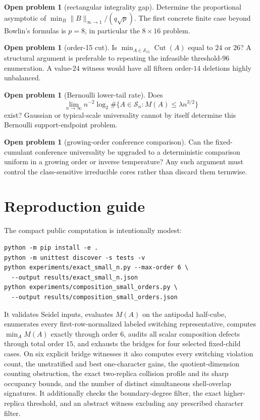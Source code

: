 \documentclass[11pt]{article}
\theoremstyle{definition}
\newtheorem{problem}[theorem]{Open problem}
\theoremstyle{remark}
\newcommand{\Sn}{\mathcal S_n}
\newcommand{\Cut}{\operatorname{Cut}}
\begin{document}
\begin{problem}[rectangular integrality gap]
Determine the proportional asymptotic of
$\min_B\|B\|_{\infty\to1}/(q\sqrt p)$.  The first concrete finite case beyond
Bowlin's formulas is $p=8$, in particular the $8\times16$ problem.
\end{problem}

\begin{problem}[order-15 cut]
Is $\min_{A\in\mathcal S_{15}}\Cut(A)$ equal to $24$ or $26$?  A structural
argument is preferable to repeating the infeasible threshold-$96$
enumeration.  A value-$24$ witness would have all fifteen order-$14$
deletions highly unbalanced.
\end{problem}

\begin{problem}[Bernoulli lower-tail rate]
Does
\[
 \lim_{n\to\infty}n^{-2}\log_2
 \#\{A\in\Sn:M(A)\le\lambda n^{3/2}\}
\]
exist?  Gaussian or typical-scale universality cannot by itself determine
this Bernoulli support-endpoint problem.
\end{problem}

\begin{problem}[growing-order conference comparison]
Can the fixed-cumulant conference universality be upgraded to a deterministic
comparison uniform in a growing order or inverse temperature?  Any such
argument must control the class-sensitive irreducible cores rather than
discard them termwise.
\end{problem}

\section{Reproduction guide}

The compact public computation is intentionally modest:
\begin{verbatim}
python -m pip install -e .
python -m unittest discover -s tests -v
python experiments/exact_small_n.py --max-order 6 \
  --output results/exact_small_n.json
python experiments/composition_small_orders.py \
  --output results/composition_small_orders.json
\end{verbatim}
It validates Seidel inputs, evaluates $M(A)$ on the antipodal half-cube,
enumerates every first-row-normalized labeled switching representative,
computes $\min_A M(A)$ exactly through order $6$, audits all scalar
composition defects through total order $15$, and exhausts the bridges for
four selected fixed-child cases.  On six explicit bridge witnesses it also
computes every switching violation count, the unstratified and best
one-character gains, the quotient-dimension counting obstruction, the exact
two-replica collision profile and its sharp occupancy bounds, and the number
of distinct simultaneous shell-overlap signatures.  It additionally checks
the boundary-degree filter, the exact higher-replica threshold, and an
abstract witness excluding any prescribed character filter.
\end{document}
